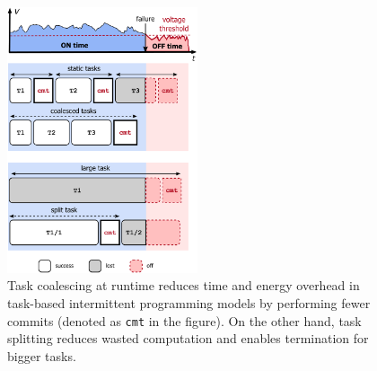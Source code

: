 \begin{figure}
    \centering
    \includegraphics[width=0.5\textwidth]{figures/intro-figure.pdf}
    \caption{Task coalescing at runtime reduces time and energy overhead in task-based intermittent programming models by performing fewer commits (denoted as \texttt{cmt} in the figure). On the other hand, task splitting reduces wasted computation and enables termination for bigger tasks.}
    \label{fig:coalesce}
\end{figure}

